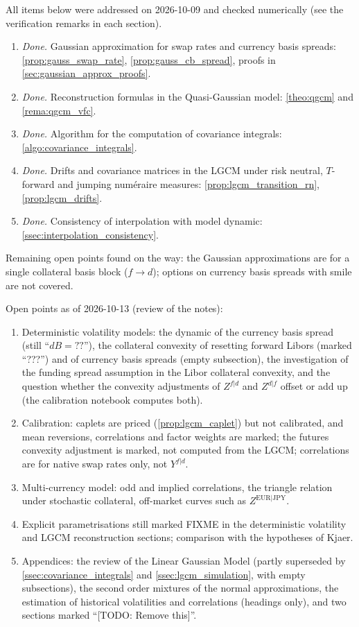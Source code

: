 \documentclass[11pt,english]{amsart}
\theoremstyle{definition}
\begin{document}
All items below were addressed on 2026-10-09 and checked numerically (see the verification remarks in each section).
\begin{enumerate}
\item \emph{Done.} Gaussian approximation for swap rates and currency basis spreads: \autoref{prop:gauss_swap_rate}, \autoref{prop:gauss_cb_spread}, proofs in \autoref{sec:gaussian_approx_proofs}.
\item \emph{Done.} Reconstruction formulas in the Quasi-Gaussian model: \autoref{theo:qgcm} and \autoref{rema:qgcm_vfc}.
\item \emph{Done.} Algorithm for the computation of covariance integrals: \autoref{algo:covariance_integrals}.
\item \emph{Done.} Drifts and covariance matrices in the LGCM under risk neutral, $T$-forward and jumping num\'eraire measures: \autoref{prop:lgcm_transition_rn}, \autoref{prop:lgcm_drifts}.
\item \emph{Done.} Consistency of interpolation with model dynamic: \autoref{ssec:interpolation_consistency}.
\end{enumerate}
Remaining open points found on the way: the Gaussian approximations are for a single collateral basis block ($f\to d$); options on currency basis spreads with smile are not covered.

Open points as of 2026-10-13 (review of the notes):
\begin{enumerate}
\item Deterministic volatility models: the dynamic of the currency basis spread (still ``$dB = ??$''), the collateral convexity of resetting forward Libors (marked ``???'') and of currency basis spreads (empty subsection), the investigation of the funding spread assumption in the Libor collateral convexity, and the question whether the convexity adjustments of $Z^{f|d}$ and $Z^{d|f}$ offset or add up (the calibration notebook computes both).
\item Calibration: caplets are priced (\autoref{prop:lgcm_caplet}) but not calibrated, and mean reversions, correlations and factor weights are marked; the futures convexity adjustment is marked, not computed from the LGCM; correlations are for native swap rates only, not $Y^{f|d}$.
\item Multi-currency model: odd and implied correlations, the triangle relation under stochastic collateral, off-market curves such as $Z^{\mathrm{EUR}|\mathrm{JPY}}$.
\item Explicit parametrisations still marked FIXME in the deterministic volatility and LGCM reconstruction sections; comparison with the hypotheses of Kjaer.
\item Appendices: the review of the Linear Gaussian Model (partly superseded by \autoref{ssec:covariance_integrals} and \autoref{ssec:lgcm_simulation}, with empty subsections), the second order mixtures of the normal approximations, the estimation of historical volatilities and correlations (headings only), and two sections marked ``[TODO: Remove this]''.
\end{enumerate}
\end{document}
